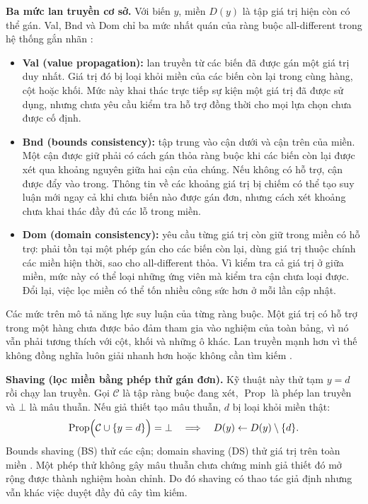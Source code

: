 \documentclass[a4paper]{cas-sc}
\begin{document}
\textbf{Ba mức lan truyền cơ sở.} Với biến $y$, miền $D(y)$ là tập giá trị hiện còn có thể gán. Val, Bnd và Dom chỉ ba mức nhất quán của ràng buộc all-different trong hệ thống gắn nhãn \citep{gecode,gecodeModeling}:
\begin{itemize}[leftmargin=1.4em,itemsep=4pt]
\item \textbf{Val (value propagation):} lan truyền từ các biến đã được gán một giá trị duy nhất. Giá trị đó bị loại khỏi miền của các biến còn lại trong cùng hàng, cột hoặc khối. Mức này khai thác trực tiếp sự kiện một giá trị đã được sử dụng, nhưng chưa yêu cầu kiểm tra hỗ trợ đồng thời cho mọi lựa chọn chưa được cố định.
\item \textbf{Bnd (bounds consistency):} tập trung vào cận dưới và cận trên của miền. Một cận được giữ phải có cách gán thỏa ràng buộc khi các biến còn lại được xét qua khoảng nguyên giữa hai cận của chúng. Nếu không có hỗ trợ, cận được đẩy vào trong. Thông tin về các khoảng giá trị bị chiếm có thể tạo suy luận mới ngay cả khi chưa biến nào được gán đơn, nhưng cách xét khoảng chưa khai thác đầy đủ các lỗ trong miền.
\item \textbf{Dom (domain consistency):} yêu cầu từng giá trị còn giữ trong miền có hỗ trợ: phải tồn tại một phép gán cho các biến còn lại, dùng giá trị thuộc chính các miền hiện thời, sao cho all-different thỏa. Vì kiểm tra cả giá trị ở giữa miền, mức này có thể loại những ứng viên mà kiểm tra cận chưa loại được. Đổi lại, việc lọc miền có thể tốn nhiều công sức hơn ở mỗi lần cập nhật.
\end{itemize}
Các mức trên mô tả năng lực suy luận của từng ràng buộc. Một giá trị có hỗ trợ trong một hàng chưa được bảo đảm tham gia vào nghiệm của toàn bảng, vì nó vẫn phải tương thích với cột, khối và những ô khác. Lan truyền mạnh hơn vì thế không đồng nghĩa luôn giải nhanh hơn hoặc không cần tìm kiếm \citep{regin1994}.

\textbf{Shaving (lọc miền bằng phép thử gán đơn).} Kỹ thuật này thử tạm $y=d$ rồi chạy lan truyền. Gọi $\mathcal C$ là tập ràng buộc đang xét, $\operatorname{Prop}$ là phép lan truyền và $\bot$ là mâu thuẫn. Nếu giả thiết tạo mâu thuẫn, $d$ bị loại khỏi miền thật:
\begin{equation}
\operatorname{Prop}\Bigl(\mathcal C\cup\{y=d\}\Bigr)=\bot
\quad\Longrightarrow\quad D(y)\leftarrow D(y)\setminus\{d\}.
\end{equation}
Bounds shaving (BS) thử các cận; domain shaving (DS) thử giá trị trên toàn miền \citep{corpus}. Một phép thử không gây mâu thuẫn chưa chứng minh giả thiết đó mở rộng được thành nghiệm hoàn chỉnh. Do đó shaving có thao tác giả định nhưng vẫn khác việc duyệt đầy đủ cây tìm kiếm.
\end{document}
